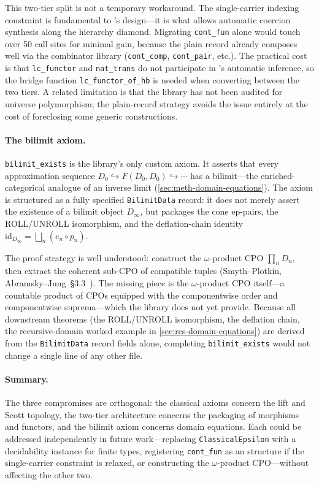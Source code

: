This two-tier split is not a temporary workaround.
The single-carrier indexing constraint is fundamental to \HB{}'s
design---it is what allows automatic coercion synthesis along the
hierarchy diamond.
Migrating \texttt{cont\_fun} alone would touch over 50 call sites
for minimal gain, because the plain record already composes well
via the combinator library (\texttt{cont\_comp}, \texttt{cont\_pair},
etc.).
The practical cost is that \texttt{lc\_functor} and
\texttt{nat\_trans} do not participate in \HB{}'s automatic inference,
so the bridge function \texttt{lc\_functor\_of\_hb} is needed when
converting between the two tiers.
A related limitation is that the library has not been audited for
universe polymorphism; the plain-record strategy avoids the issue
entirely at the cost of foreclosing some generic constructions.

\paragraph{The bilimit axiom.}
\texttt{bilimit\_exists} is the library's only custom axiom.
It asserts that every approximation sequence
$D_0 \hookrightarrow F(D_0, D_0) \hookrightarrow \cdots$ has a
bilimit---the enriched-categorical analogue of an inverse limit
(\cref{sec:meth-domain-equations}).
The axiom is structured as a fully specified \texttt{BilimitData}
record: it does not merely assert the existence of a bilimit object
$D_\infty$, but packages the cone ep-pairs, the ROLL/UNROLL
isomorphism, and the deflation-chain identity
$\mathrm{id}_{D_\infty} = \bigsqcup_n (e_n \circ p_n)$.

The proof strategy is well understood: construct the $\omega$-product
CPO $\prod_n D_n$, then extract the coherent sub-CPO of
compatible tuples (Smyth--Plotkin, Abramsky--Jung~\S3.3~\cite{AJ1994}).
The missing piece is the $\omega$-product CPO itself---a countable
product of CPOs equipped with the componentwise order and
componentwise suprema---which the library does not yet provide.
Because all downstream theorems (the ROLL/UNROLL isomorphism, the
deflation chain, the recursive-domain worked example in
\cref{sec:res-domain-equations}) are derived from the
\texttt{BilimitData} record fields alone, completing
\texttt{bilimit\_exists} would not change a single line of any other
file.

\paragraph{Summary.}
The three compromises are orthogonal: the classical axioms concern the
lift and Scott topology, the two-tier architecture concerns the
packaging of morphisms and functors, and the bilimit axiom concerns
domain equations.
Each could be addressed independently in future work---replacing
\texttt{ClassicalEpsilon} with a decidability instance for finite
types, registering \texttt{cont\_fun} as an \HB{} structure if the
single-carrier constraint is relaxed, or constructing the
$\omega$-product CPO---without affecting the other two.

